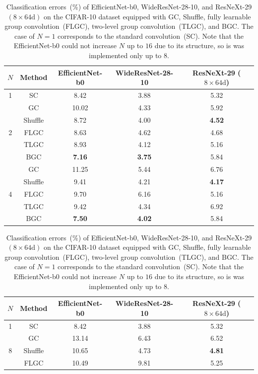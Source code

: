 \documentclass[preprint,12pt,authoryear]{elsarticle}
\numberwithin{equation}{section}
\theoremstyle{remark}
\begin{document}
\begin{table}
  \centering
  \caption{Classification errors~(\%) of EfficientNet-b0, WideResNet-28-10, and ResNeXt-29 $(8 \times 64\text{d})$ on the CIFAR-10 dataset equipped with GC, Shuffle, fully learnable group convolution~(FLGC), two-level group convolution~(TLGC), and BGC.
  The case of $N=1$ corresponds to the standard convolution~(SC).
  Note that the EfficientNet-b0 could not increase $N$ up to $16$ due to its structure, so is was implemented only up to $8$.}
  \label{tab:comp}
  \begin{tabular}{c|c|ccc}
    \toprule
    $N$ & Method & EfficientNet-b0 & WideResNet-28-10 & ResNeXt-29 ($8 \times 64\text{d}$) \\ \midrule\midrule
    1 & SC & 8.42 & 3.88 & 5.32 \\ \midrule
    \multirow{5}{*}{2}  & GC & 10.02 & 4.33 & 5.92 \\
                        & Shuffle & 8.72 & 4.00 & \textbf{4.52} \\
                        & FLGC & 8.63 & 4.62 & 4.68 \\
                        & TLGC & 8.93 & 4.12 & 5.16 \\
                        & BGC & \textbf{7.16} & \textbf{3.75} & 5.84 \\ \midrule
    \multirow{5}{*}{4}  & GC & 11.25 & 5.44 & 6.76 \\
                        & Shuffle & 9.41 & 4.21 & \textbf{4.17} \\
                        & FLGC & 9.70 & 6.16 & 5.16 \\
                        & TLGC & 9.42 & 4.34 & 6.92 \\
                        & BGC & \textbf{7.50} & \textbf{4.02} & 5.84 \\ \bottomrule
    \end{tabular}
  \begin{tabular}{c|c|ccc}
    \toprule
    $N$ & Method & EfficientNet-b0 & WideResNet-28-10 & ResNeXt-29 ($8 \times 64\text{d}$) \\ \midrule\midrule
    1 & SC & 8.42 & 3.88 & 5.32 \\ \midrule
    \multirow{5}{*}{8}  & GC & 13.14 & 6.43 & 6.52 \\
                        & Shuffle & 10.65 & 4.73 & \textbf{4.81} \\
                        & FLGC & 10.49 & 9.81 & 5.25 \\

\end{tabular}
\end{table}
\end{document}

